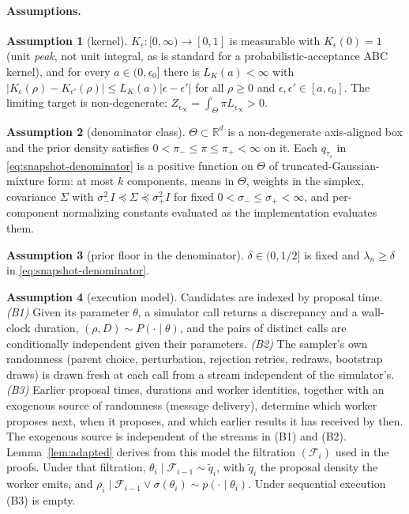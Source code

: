 \documentclass[10pt]{article}
\theoremstyle{plain}
\theoremstyle{definition}
\newtheorem{assumption}{Assumption}
\begin{document}
\paragraph{Assumptions.}
\begin{assumption}[kernel]\label{ass:kernel} $K_\epsilon:[0,\infty)\to[0,1]$ is measurable with $K_\epsilon(0)=1$ (unit \emph{peak}, not unit integral, as is standard for a probabilistic-acceptance ABC kernel), and for every $a\in(0,\epsilon_0]$ there is $L_K(a)<\infty$ with $|K_\epsilon(\rho)-K_{\epsilon'}(\rho)|\le L_K(a)|\epsilon-\epsilon'|$ for all $\rho\ge0$ and $\epsilon,\epsilon'\in[a,\epsilon_0]$. The limiting target is non-degenerate: $Z_{\epsilon_\infty}=\int_\Theta\pi L_{\epsilon_\infty}>0$.\end{assumption}
\begin{assumption}[denominator class]\label{ass:class} $\Theta\subset\mathbb{R}^d$ is a non-degenerate axis-aligned box and the prior density satisfies $0<\pi_-\le\pi\le\pi_+<\infty$ on it. Each $q_{\tau_s}$ in \eqref{eq:snapshot-denominator} is a positive function on $\Theta$ of truncated-Gaussian-mixture form: at most $k$ components, means in $\Theta$, weights in the simplex, covariance $\Sigma$ with $\sigma_-^2I\preceq\Sigma\preceq\sigma_+^2I$ for fixed $0<\sigma_-\le\sigma_+<\infty$, and per-component normalizing constants evaluated as the implementation evaluates them.\end{assumption}
\begin{assumption}[prior floor in the denominator]\label{ass:defensive} $\delta\in(0,1/2]$ is fixed and $\lambda_n\ge\delta$ in \eqref{eq:snapshot-denominator}.\end{assumption}
\begin{assumption}[execution model]\label{ass:filtration} Candidates are indexed by proposal time. \emph{(B1)} Given its parameter $\theta$, a simulator call returns a discrepancy and a wall-clock duration, $(\rho,D)\sim P(\cdot\mid\theta)$, and the pairs of distinct calls are conditionally independent given their parameters. \emph{(B2)} The sampler's own randomness (parent choice, perturbation, rejection retries, redraws, bootstrap draws) is drawn fresh at each call from a stream independent of the simulator's. \emph{(B3)} Earlier proposal times, durations and worker identities, together with an exogenous source of randomness (message delivery), determine which worker proposes next, when it proposes, and which earlier results it has received by then. The exogenous source is independent of the streams in (B1) and (B2). Lemma~\ref{lem:adapted} derives from this model the filtration $(\mathcal{F}_i)$ used in the proofs. Under that filtration, $\theta_i\mid\mathcal{F}_{i-1}\sim\tilde q_i$, with $\tilde q_i$ the proposal density the worker emits, and $\rho_i\mid\mathcal{F}_{i-1}\vee\sigma(\theta_i)\sim p(\cdot\mid\theta_i)$. Under sequential execution (B3) is empty.\end{assumption}
\end{document}
